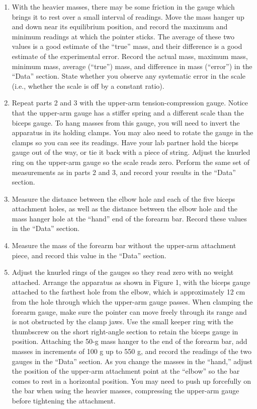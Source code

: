 \begin{enumerate}[label=\arabic*.]
\item With the heavier masses, there may be some friction in the gauge which brings it to rest over a small interval of readings.  Move the mass hanger up and down near its equilibrium position, and record the maximum and minimum readings at which the pointer sticks.  The average of these two values is a good estimate of the ``true'' mass, and their difference is a good estimate of the experimental error.  Record the actual mass, maximum mass, minimum mass, average (``true'') mass, and difference in mass (``error'') in the ``Data'' section.  State whether you observe any systematic error in the scale (i.e., whether the scale is off by a constant ratio).

\item Repeat parts 2 and 3 with the upper-arm tension-compression gauge.  Notice that the upper-arm gauge has a stiffer spring and a different scale than the biceps gauge.  To hang masses from this gauge, you will need to invert the apparatus in its holding clamps.  You may also need to rotate the gauge in the clamps so you can see its readings.  Have your lab partner hold the biceps gauge out of the way, or tie it back with a piece of string.  Adjust the knurled ring on the upper-arm gauge so the scale reads zero.  Perform the same set of measurements as in parts 2 and 3, and record your results in the ``Data'' section.

\item Measure the distance between the elbow hole and each of the five biceps attachment holes, as well as the distance between the elbow hole and the mass hanger hole at the ``hand'' end of the forearm bar.  Record these values in the ``Data'' section.

\item Measure the mass of the forearm bar without the upper-arm attachment piece, and record this value in the ``Data'' section.

\item Adjust the knurled rings of the gauges so they read zero with no weight attached.  Arrange the apparatus as shown in Figure 1, with the biceps gauge attached to the farthest hole from the elbow, which is approximately 12 cm from the hole through which the upper-arm gauge passes.  When clamping the forearm gauge, make sure the pointer can move freely through its range and is not obstructed by the clamp jaws.  Use the small keeper ring with the thumbscrew on the short right-angle section to retain the biceps gauge in position.  Attaching the 50-g mass hanger to the end of the forearm bar, add masses in increments of 100 g up to 550 g, and record the readings of the two gauges in the ``Data'' section.  As you change the masses in the ``hand,'' adjust the position of the upper-arm attachment point at the ``elbow'' so the bar comes to rest in a horizontal position.  You may need to push up forcefully on the bar when using the heavier masses, compressing the upper-arm gauge before tightening the attachment.


\end{enumerate}

